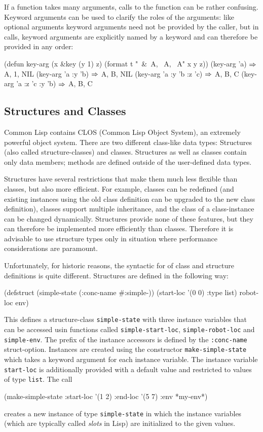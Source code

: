 \documentclass[a4paper]{amsart}
\begin{document}
If a function takes many arguments, calls to the function can be
rather confusing.  Keyword arguments can be used to clarify the roles
of the arguments: like optional arguments keyword arguments need not
be provided by the caller, but in calls, keyword arguments are
explicitly named by a keyword and can therefore be provided in any
order:
\begin{Code}
  (defun key-arg (x &key (y 1) z)
    (format t "~&~A, ~A, ~A" x y z))
  (key-arg 'a)                    $\Rightarrow$ A, 1, NIL
  (key-arg 'a :y 'b)              $\Rightarrow$ A, B, NIL 
  (key-arg 'a :y 'b :z 'c)        $\Rightarrow$ A, B, C 
  (key-arg 'a :z 'c :y 'b)        $\Rightarrow$ A, B, C 
\end{Code}

\subsection{Structures and Classes}
\label{sec:structs-classes}

Common Lisp contains CLOS (Common Lisp Object System), an extremely
powerful object system.  There are two different class-like data
types: Structures (also called structure-classes) and classes.
Structures as well as classes contain only data members; methods are
defined outside of the user-defined data types.

Structures have several restrictions that make them much less flexible
than classes, but also more efficient.  For example, classes can be
redefined (and existing instances using the old class definition can
be upgraded to the new class definition), classes support multiple
inheritance, and the class of a class-instance can be changed
dynamically.  Structures provide none of these features, but they can
therefore be implemented more efficiently than classes.  Therefore it
is advisable to use structure types only in situation where
performance considerations are paramount.

Unfortunately, for historic reasons, the syntactic for of class and
structure definitions is quite different.  Structures are defined in
the following way:
\begin{Code}
  (defstruct (simple-state (:conc-name #:simple-))
    (start-loc '(0 0) :type list)
    robot-loc
    env)  
\end{Code}
This defines a structure-class \texttt{simple-state} with three
instance variables that can be accessed usin functions called
\texttt{simple-start-loc}, \texttt{simple-robot-loc} and
\texttt{simple-env}.  The prefix of the instance accessors is defined
by the \texttt{:conc-name} struct-option.  Instances are created using
the constructor \texttt{make-simple-state} which takes a keyword
argument for each instance variable.  The instance variable
\texttt{start-loc} is additionally provided with a default value and
restricted to values of type \texttt{list}.  The call
\begin{Code}
  (make-simple-state :start-loc '(1 2) :end-loc '(5 7) :env *my-env*)
\end{Code}
creates a new instance of type \texttt{simple-state} in which the
instance variables (which are typically called \emph{slots} in Lisp)
are initialized to the given values.
\end{document}
